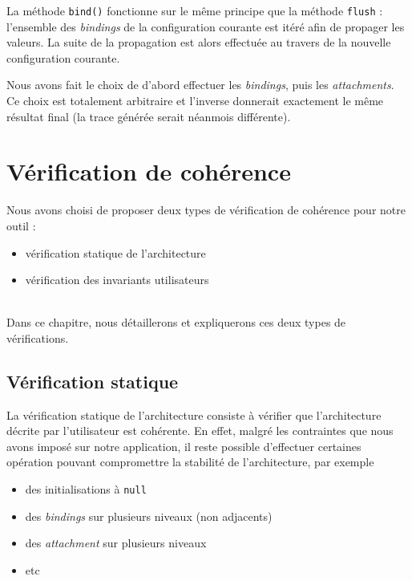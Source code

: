         La méthode \lstinline{bind()} fonctionne sur le même principe que la méthode \lstinline{flush} : l'ensemble des \emph{bindings} de la configuration courante est itéré afin de propager les valeurs. La suite de la propagation est alors effectuée au travers de la nouvelle configuration courante.
        \newline
        
        Nous avons fait le choix de d'abord effectuer les \emph{bindings}, puis les \emph{attachments}. Ce choix est totalement arbitraire et l'inverse donnerait exactement le même résultat final (la trace générée serait néanmois différente).
        
\chapter{Vérification de cohérence}
\label{checker-chapter}

	Nous avons choisi de proposer deux types de vérification de cohérence pour notre outil : 
    \begin{itemize}
    	\item vérification statique de l'architecture
        \item vérification des invariants utilisateurs
	\end{itemize}
    ~\\
    
    Dans ce chapitre, nous détaillerons et expliquerons ces deux types de vérifications.
    
    \section{Vérification statique}
    	La vérification statique de l'architecture consiste à vérifier que l'architecture décrite par l'utilisateur est cohérente. En effet, malgré les contraintes que nous avons imposé sur notre application, il reste possible d'effectuer certaines opération pouvant compromettre la stabilité de l'architecture, par exemple
        \begin{itemize}
        	\item des initialisations à \lstinline{null}
            \item des \emph{bindings} sur plusieurs niveaux (non adjacents)
            \item des \emph{attachment} sur plusieurs niveaux
            \item etc
		\end{itemize}
        ~\\
        
